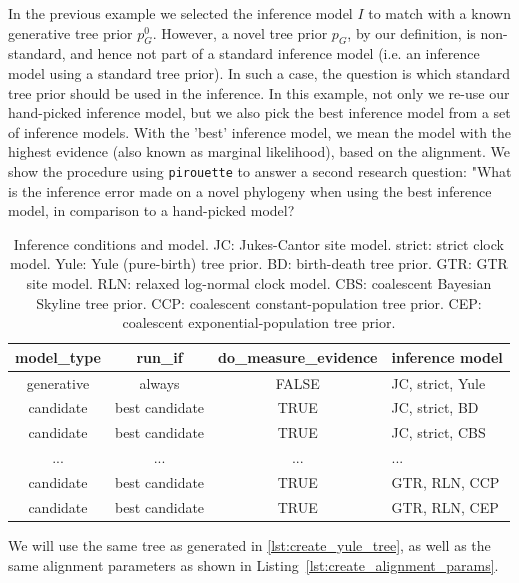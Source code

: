 In the previous example we selected the inference model $\mathit{I}$ to match 
with a known generative tree prior $\mathit{p_{G}^0}$.
However, a novel tree prior $\mathit{p_{G}}$, by our definition, is non-standard, and hence not part of a standard inference 
model (i.e. an inference model using a standard tree prior).
In such a case, the question is which standard tree prior should be used in the inference.
In this example, not only we re-use our hand-picked inference model, but we also pick the best inference model from a set of inference models.
With the 'best' inference model, we mean the model with the highest evidence (also known as marginal likelihood), based on the alignment.
We show the procedure using \verb;pirouette; to answer a second research question: "What is the inference error made on a novel phylogeny when using the best inference model, in comparison to a hand-picked model?

\begin{table}
  \begin{tabular}{ | c | c | c | l | }
    \hline
    \textbf{model\_type} &
    \textbf{run\_if} &
    \textbf{do\_measure\_evidence} & 
    \textbf{inference model} \\ 
    \hline
    generative & always         & FALSE & JC, strict, Yule \\
    candidate  & best candidate & TRUE  & JC, strict, BD   \\
    candidate  & best candidate & TRUE  & JC, strict, CBS  \\
    ...        & ...            & ...   & ...              \\
    candidate  & best candidate & TRUE  & GTR, RLN, CCP    \\
    candidate  & best candidate & TRUE  & GTR, RLN, CEP    \\
    \hline
  \end{tabular}
  \caption{
    Inference conditions and model.
    JC: Jukes-Cantor site model.
    strict: strict clock model.
    Yule: Yule (pure-birth) tree prior.
    BD: birth-death tree prior.
    GTR: GTR site model.
    RLN: relaxed log-normal clock model.
    CBS: coalescent Bayesian Skyline tree prior.
    CCP: coalescent constant-population tree prior.
    CEP: coalescent exponential-population tree prior.
  }
  \label{tab:RQ2}
\end{table}

We will use the same tree as generated in \ref{lst:create_yule_tree}, as well as the same alignment parameters as shown in Listing~\ref{lst:create_alignment_params}.

